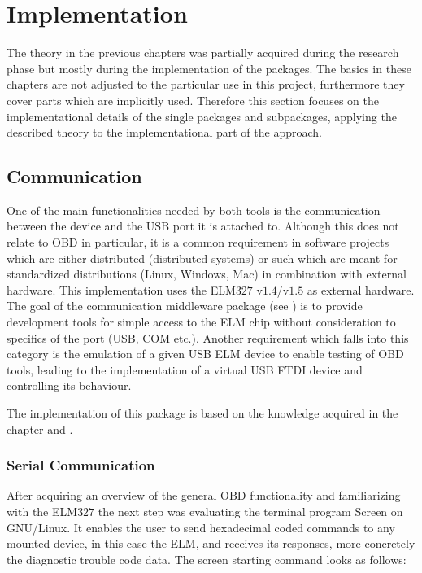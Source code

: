 
\chapter{Implementation}
\label{sec:impl}
The theory in the previous chapters was partially acquired during the research phase but mostly during the implementation of the packages. 
The basics in these chapters are not adjusted to the particular use in this project, furthermore they cover parts which are implicitly used. 
Therefore this section focuses on the implementational details of the single packages and subpackages, applying the described theory to the 
implementational part of the approach.

\section{Communication}
\label{sec:comm}
One of the main functionalities needed by both tools is the communication between the device and the USB port it is attached to. Although this does not relate 
to OBD in particular, it is a 
common requirement in software projects which are either distributed (distributed systems) or such which are 
meant for standardized distributions (Linux, Windows, Mac) in combination with external hardware. This implementation uses the ELM$327$ v$1.4$/v$1.5$ \cite{ELM} 
as external hardware. The goal of the communication middleware package (see ) is to provide development tools for simple access 
to the ELM chip without consideration to specifics of the port (USB, COM etc.). Another requirement which falls into this category is the emulation 
of a given USB ELM device to enable testing of OBD tools, leading to the implementation of a virtual USB FTDI device and controlling its behaviour.

The implementation of this package is based on the knowledge acquired in the chapter  and .

\subsection{Serial Communication}
\label{sec:serialComm}
After acquiring an overview of the general OBD functionality and familiarizing with the ELM$327$ the next step was evaluating the terminal program 
Screen \cite{SCREEN} on GNU/Linux. It enables the user to send hexadecimal coded commands to any mounted device, in this case the ELM, and receives its responses, 
more concretely the diagnostic trouble code data. The screen starting command looks as follows:

